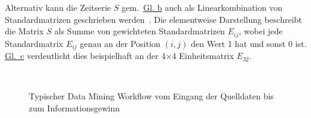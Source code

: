 Alternativ kann die Zeitserie $S$ gem.~\hyperref[eq:timeseries_matrix_sum]{Gl. b} auch als Linearkombination
von Standardmatrizen geschrieben werden~\cite[S.~8]{Voigt2012}. Die elementweise Darstellung beschreibt die Matrix $S$ als Summe von
gewichteten Standardmatrizen $E_{ij}$, wobei jede Standardmatrix $E_{ij}$ genau an der Position $(i,j)$ den Wert 1 hat und sonst 0 ist.
\hyperref[eq:timeseries_matrix_sum]{Gl.~c} verdeutlicht dies beispielhaft an der 4$\times$4 Einheitsmatrix
$E_{32}$.

\begin{figure}[t!]
    \centering
    \caption{\centering Typischer Data Mining Workflow vom Eingang der Quelldaten bis zum Informationsgewinn}
~\label{fig:data_mining}
\end{figure}

